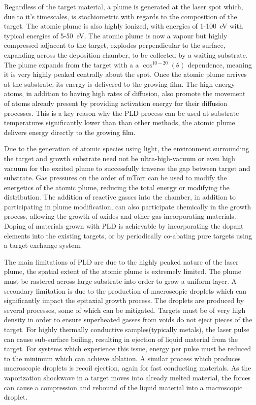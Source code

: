 Regardless of the target material, a plume is generated at the laser spot which, due to it's timescales, is stochiometric with regards to the composition of the target. The atomic plume is also highly ionized, with energies of 1-100~eV with typical energies of 5-50~eV. The atomic plume is now a vapour but highly compressed adjacent to the target, explodes perpendicular to the surface, expanding across the deposition chamber, to be collected by a waiting substrate. The plume expands from the target with a a $\cos^{10-20}(\theta)$ dependence, meaning it is very highly peaked centrally about the spot. Once the atomic plume arrives at the substrate, its energy is delivered to the growing film. The high energy atoms, in addition to having high rates of diffusion, also promote the movement of atoms already present by providing activation energy for their diffusion processes\cite{Willmott2000}. This is a key reason why the PLD process can be used at substrate temperatures significantly lower than than other methods, the atomic plume delivers energy directly to the growing film.

Due to the generation of atomic species using light, the environment surrounding the target and growth substrate need not be ultra-high-vacuum or even high vacuum for the excited plume to successfully traverse the gap between target and substrate. Gas pressures on the order of mTorr can be used to modify the energetics of the atomic plume, reducing the total energy or modifying the distribution\cite{Willmott2000}. The addition of reactive gasses into the chamber, in addition to participating in plume modification, can also participate chemically in the growth process, allowing the growth of oxides and other gas-incorporating materials. Doping of materials grown with PLD is achievable by incorporating the dopant elements into the existing targets, or by periodically co-abating pure targets using a target exchange system.

The main limitations of PLD are due to the highly peaked nature of the laser plume, the spatial extent of the atomic plume is extremely limited. The plume must be rastered across large substrate into order to grow a uniform layer. A secondary limitation is due to the production of macroscopic droplets which can significantly impact the epitaxial growth process. The droplets are produced by several processes, some of which can be mitigated. Targets must be of very high density in order to ensure superheated gasses from voids do not eject pieces of the target. For highly thermally conductive samples(typically metals), the laser pulse can cause sub-surface boiling, resulting in ejection of liquid material from the target. For systems which experience this issue, energy per pulse must be reduced to the minimum which can achieve ablation. A similar process which produces macroscopic droplets is recoil ejection, again for fast conducting materials. As the vaporization shockwave in a target moves into already melted material, the forces can cause a compression and rebound of the liquid material into a macroscopic droplet.

